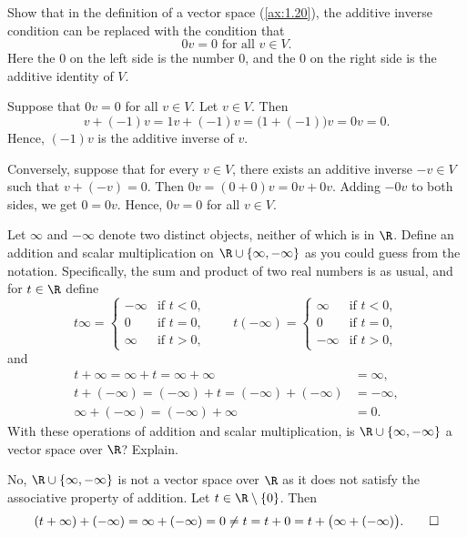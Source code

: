 \begin{exercise}
Show that in the definition of a vector space (\ref{ax:1.20}), the additive
inverse condition can be replaced with the condition that
\[ 0v=0 \text{ for all } v\in V. \]
Here the $0$ on the left side is the number $0$, and the $0$ on the right side
is the additive identity of $V$.
\end{exercise}
\begin{solution}
Suppose that $0v=0$ for all $v\in V$. Let $v\in V$. Then
\[ v+(-1)v = 1v+(-1)v = \bigl(1+(-1)\bigr)v = 0v = 0. \]
Hence, $(-1)v$ is the additive inverse of $v$.

Conversely, suppose that for every $v\in V$, there exists an additive inverse
$-v\in V$ such that $v+(-v)=0$. Then $0v=(0+0)v=0v+0v$. Adding $-0v$ to both
sides, we get $0=0v$. Hence, $0v=0$ for all $v\in V$.
\end{solution}

\begin{exercise}
Let $\infty$ and $-\infty$ denote two distinct objects, neither of which is in
$\R$. Define an addition and scalar multiplication on $\R\cup\{\infty,-\infty\}$
as you could guess from the notation. Specifically, the sum and product of two
real numbers is as usual, and for $t\in\R$ define
\[ t\infty = \begin{cases} -\infty & \text{if } t<0,\\ 0 & \text{if } t=0,\\
     \infty & \text{if } t>0, \end{cases}
   \qquad
   t(-\infty) = \begin{cases} \infty & \text{if } t<0,\\ 0 & \text{if } t=0,\\
     -\infty & \text{if } t>0, \end{cases} \]
and
\begin{align*}
t+\infty = \infty+t = \infty+\infty &= \infty,\\
t+(-\infty) = (-\infty)+t = (-\infty)+(-\infty) &= -\infty,\\
\infty+(-\infty) = (-\infty)+\infty &= 0.
\end{align*}
With these operations of addition and scalar multiplication, is
$\R\cup\{\infty,-\infty\}$ a vector space over $\R$? Explain.
\end{exercise}
\begin{solution}
No, $\R\cup\{\infty,-\infty\}$ is not a vector space over $\R$ as it does not
satisfy the associative property of addition. Let $t\in\R\setminus\{0\}$. Then
\[ (t+\infty)+(-\infty) = \infty+(-\infty) = 0 \ne t = t+0
   = t+\bigl(\infty+(-\infty)\bigr). \qedhere \]
\end{solution}

